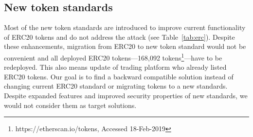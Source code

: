 \subsection{New token standards}
Most of the new token standards are introduced to improve current functionality of ERC20 tokens and do not address the attack (see Table~\ref{tab:erc}). Despite these enhancements, migration from ERC20 to new token standard would not be convenient and all deployed ERC20 tokens---168,092 tokens\footnote{https://etherscan.io/tokens, Accessed 18-Feb-2019}---have to be redeployed. This also means update of trading platform who already listed ERC20 tokens. Our goal is to find a backward compatible solution instead of changing current ERC20 standard or migrating tokens to a new standards. Despite expanded features and improved security properties of new standards, we would not consider them as target solutions.

